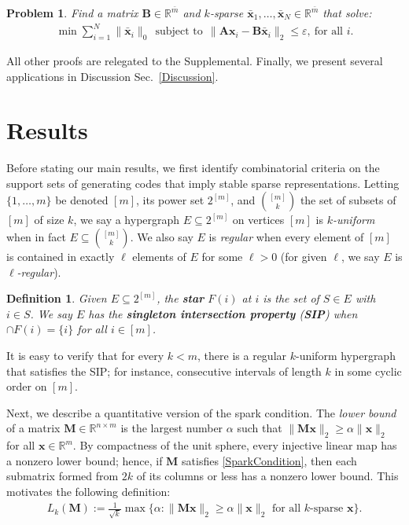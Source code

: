 \documentclass[9pt,twocolumn]{pnas-new}
\newtheorem{problem}{Problem}
\newtheorem{definition}{Definition}
\begin{document}
\begin{problem}\label{OptimizationProblem}
Find a matrix $\mathbf{B} \in \mathbb{R}^{\bar m}$ and $k$-sparse $\mathbf{\bar x}_1, \ldots, \mathbf{\bar x}_N \in \mathbb{R}^{\bar m}$ that solve:
\begin{align}\label{minsum}
\min \sum_{i = 1}^N \|\mathbf{\bar x}_i\|_0 \ \ 
\text{subject to} \ \ \|\mathbf{A}\mathbf{x}_i - \mathbf{B}\mathbf{\bar x}_i\|_2 \leq \varepsilon, \ \text{for all $i$}.
\end{align}
\end{problem}

All other proofs are relegated to the Supplemental. 
Finally, we present several applications in Discussion Sec.~\ref{Discussion}. 

\section{Results}\label{Results}

Before stating our main results, we first identify combinatorial criteria on the support sets of generating codes that imply stable sparse representations.  Letting $\{1, \ldots, m\}$ be denoted $[m]$, its power set $2^{[m]}$, and ${[m] \choose k}$ the set of subsets of $[m]$ of size $k$,
we say a hypergraph $E \subseteq 2^{[m]}$ on vertices $[m]$ is \textit{$k$-uniform} when in fact $E \subseteq {[m] \choose k}$. We also say $E$ is \emph{regular} when every element of $[m]$ is contained in exactly $\ell$ elements of $E$ for some $\ell > 0$ (for given $\ell$, we say $E$ is \textit{$\ell$-regular}).

\begin{definition}\label{sip}
Given $E \subseteq 2^{[m]}$, the \textbf{star} $F(i)$ at $i$ is the set of $S \in E$ with $i \in S$. We say $E$ has the \textbf{singleton intersection property} (\textbf{SIP}) when $\cap F(i) = \{i\}$ for all $i \in [m]$. 
\end{definition}

It is easy to verify that for every $k < m$, there is a regular $k$-uniform hypergraph that satisfies the SIP; for instance, consecutive intervals of length $k$ in some cyclic order on $[m]$.

Next, we describe a quantitative version of the spark condition.  
The \emph{lower bound} \cite{Grcar10} of a matrix $\mathbf{M} \in \mathbb R^{n \times m}$ is the largest number $\alpha$ such that \mbox{$\|\mathbf{M}\mathbf{x}\|_2 \geq \alpha\|\mathbf{x}\|_2$} for all $\mathbf{x} \in \mathbb{R}^m$. By compactness of the unit sphere, every injective linear map has a nonzero lower bound; hence, if $\mathbf{M}$ satisfies \eqref{SparkCondition}, then each submatrix formed from $2k$ of its columns or less has a nonzero lower bound. This motivates the following definition: 
\begin{align*}
L_k(\mathbf{M}) := \frac{1}{\sqrt{k}}\max \{ \alpha : \|\mathbf{M}\mathbf{x}\|_2 \geq \alpha\|\mathbf{x}\|_2 \text{ for all $k$-sparse } \mathbf{x}\}.
\end{align*} 
\end{document}
